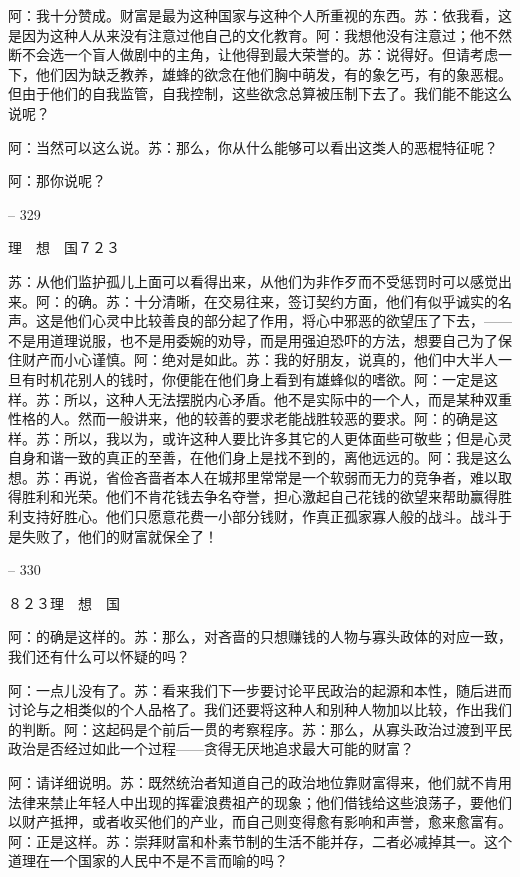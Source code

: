 \documentclass[11pt,oneside]{book}
\begin{document}
\begin{common-format}
    阿：我十分赞成。财富是最为这种国家与这种个人所重视的东西。苏：依我看，这是因为这种人从来没有注意过他自己的文化教育。阿：我想他没有注意过；他不然断不会选一个盲人做剧中的主角，让他得到最大荣誉的。苏：说得好。但请考虑一下，他们因为缺乏教养，雄蜂的欲念在他们胸中萌发，有的象乞丐，有的象恶棍。但由于他们的自我监管，自我控制，这些欲念总算被压制下去了。我们能不能这么说呢？

    阿：当然可以这么说。苏：那么，你从什么能够可以看出这类人的恶棍特征呢？

    阿：那你说呢？

    

-- 329

    理　想　国７２３

    苏：从他们监护孤儿上面可以看得出来，从他们为非作歹而不受惩罚时可以感觉出来。阿：的确。苏：十分清晰，在交易往来，签订契约方面，他们有似乎诚实的名声。这是他们心灵中比较善良的部分起了作用，将心中邪恶的欲望压了下去，——不是用道理说服，也不是用委婉的劝导，而是用强迫恐吓的方法，想要自己为了保住财产而小心谨慎。阿：绝对是如此。苏：我的好朋友，说真的，他们中大半人一旦有时机花别人的钱时，你便能在他们身上看到有雄蜂似的嗜欲。阿：一定是这样。苏：所以，这种人无法摆脱内心矛盾。他不是实际中的一个人，而是某种双重性格的人。然而一般讲来，他的较善的要求老能战胜较恶的要求。阿：的确是这样。苏：所以，我以为，或许这种人要比许多其它的人更体面些可敬些；但是心灵自身和谐一致的真正的至善，在他们身上是找不到的，离他远远的。阿：我是这么想。苏：再说，省俭吝啬者本人在城邦里常常是一个软弱而无力的竞争者，难以取得胜利和光荣。他们不肯花钱去争名夺誉，担心激起自己花钱的欲望来帮助赢得胜利支持好胜心。他们只愿意花费一小部分钱财，作真正孤家寡人般的战斗。战斗于是失败了，他们的财富就保全了！

    

-- 330

    ８２３理　想　国

    阿：的确是这样的。苏：那么，对吝啬的只想赚钱的人物与寡头政体的对应一致，我们还有什么可以怀疑的吗？

    阿：一点儿没有了。苏：看来我们下一步要讨论平民政治的起源和本性，随后进而讨论与之相类似的个人品格了。我们还要将这种人和别种人物加以比较，作出我们的判断。阿：这起码是个前后一贯的考察程序。苏：那么，从寡头政治过渡到平民政治是否经过如此一个过程——贪得无厌地追求最大可能的财富？

    阿：请详细说明。苏：既然统治者知道自己的政治地位靠财富得来，他们就不肯用法律来禁止年轻人中出现的挥霍浪费祖产的现象；他们借钱给这些浪荡子，要他们以财产抵押，或者收买他们的产业，而自己则变得愈有影响和声誉，愈来愈富有。阿：正是这样。苏：崇拜财富和朴素节制的生活不能并存，二者必减掉其一。这个道理在一个国家的人民中不是不言而喻的吗？


\end{common-format}
\end{document}
